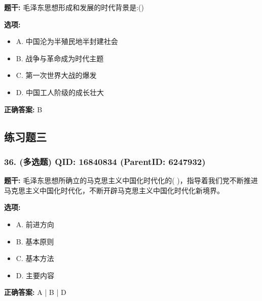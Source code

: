 \documentclass[12pt,UTF8]{ctexart}
\begin{document}
\textbf{题干:}
毛泽东思想形成和发展的时代背景是:()



\textbf{选项:}
\begin{itemize}[leftmargin=*]

  \item A. 中国沦为半殖民地半封建社会

  \item B. 战争与革命成为时代主题

  \item C. 第一次世界大战的爆发

  \item D. 中国工人阶级的成长壮大

\end{itemize}

\textbf{正确答案:}
B

\vspace{0.3em}\hrulefill\vspace{0.7em}

\subsection*{练习题三}

\subsubsection*{36. (多选题) \small QID: 16840834 (ParentID: 6247932)}

\textbf{题干:}
毛泽东思想所确立的马克思主义中国化时代化的( )，指导着我们党不断推进马克思主义中国化时代化，不断开辟马克思主义中国化时代化新境界。



\textbf{选项:}
\begin{itemize}[leftmargin=*]

  \item A. 前进方向

  \item B. 基本原则

  \item C. 基本方法

  \item D. 主要内容

\end{itemize}

\textbf{正确答案:}
A | B | D

\vspace{0.3em}\hrulefill\vspace{0.7em}
\end{document}
